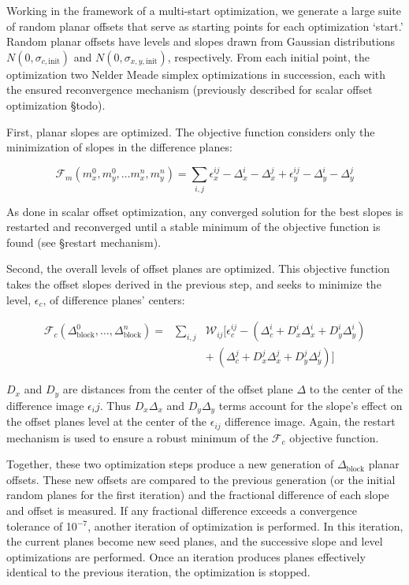 \documentclass[iop]{emulateapj}
\newcommand{\todo}[1]{\textcolor{RedOrange}{#1}} %
\begin{document}
Working in the framework of a multi-start optimization, we generate a large suite of random planar offsets that serve as starting points for each optimization `start.' Random planar offsets have levels and slopes drawn from Gaussian distributions $N(0, \sigma_{c,\mathrm{init}})$ and $N(0, \sigma_{x,y,\mathrm{init}})$, respectively. From each initial point, the optimization two Nelder Meade simplex optimizations in succession, each with the ensured reconvergence mechanism (previously described for scalar offset optimization \S \todo{todo}).

First, planar slopes are optimized. The objective function considers only the minimization of slopes in the difference planes:

\begin{equation}
	\mathcal{F}_m(m_x^0,m_y^0,\ldots m_x^n, m_y^n) = \sum_{i,j} \epsilon_x^{ij} - \Delta_x^i - \Delta_x^j + \epsilon_y^{ij} - \Delta_y^i - \Delta_y^j
\end{equation}

\noindent As done in scalar offset optimization, any converged solution for the best slopes is restarted and reconverged until a stable minimum of the objective function is found (see \S \todo{restart mechanism}).

Second, the overall levels of offset planes are optimized. This objective function takes the offset slopes derived in the previous step, and seeks to minimize the level, $\epsilon_c$, of difference planes' centers:

\begin{eqnarray}\nonumber
	\mathcal{F}_c(\Delta_\mathrm{block}^0,\ldots,\Delta_\mathrm{block}^n) = &\sum_{i,j}& \mathcal{W}_{ij} [ \epsilon^{ij}_c - (\Delta_c^i + D_x^i\Delta_x^i + D_y^i\Delta_y^i) \\
	&& +~(\Delta_c^j + D_x^j\Delta_x^j + D_y^j\Delta_y^j) ]
\end{eqnarray}

$D_x$ and $D_y$ are distances from the center of the offset plane $\Delta$ to the center of the difference image $\epsilon_ij$. Thus $D_x\Delta_x$ and $D_y\Delta_y$ terms account for the slope's effect on the offset planes level at the center of the $\epsilon_{ij}$ difference image. Again, the restart mechanism is used to ensure a robust minimum of the $\mathcal{F}_c$ objective function.

Together, these two optimization steps produce a new generation of $\Delta_\mathrm{block}$ planar offsets. These new offsets are compared to the previous generation (or the initial random planes for the first iteration) and the fractional difference of each slope and offset is measured. If any fractional difference exceeds a convergence tolerance of 10$^{-7}$, another iteration of optimization is performed. In this iteration, the current planes become new seed planes, and the successive slope and level optimizations are performed. Once an iteration produces planes effectively identical to the previous iteration, the optimization is stopped.
\end{document}
